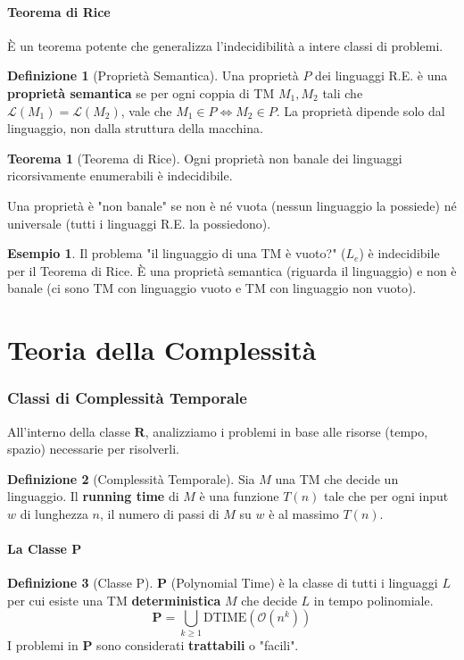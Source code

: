 \documentclass[a4paper]{article}
\theoremstyle{definition} %
\newtheorem{theorem}{Teorema}
\newtheorem{definition}{Definizione}
\newtheorem{example}{Esempio}
\newcommand{\lang}[1]{\mathcal{L}(#1)}
\newcommand{\bigO}[1]{\mathcal{O}(#1)}
\begin{document}
\subsection{Teorema di Rice}
È un teorema potente che generalizza l'indecidibilità a intere classi di problemi.
\begin{definition}[Proprietà Semantica]
Una proprietà $P$ dei linguaggi R.E. è una \textbf{proprietà semantica} se per ogni coppia di TM $M_1, M_2$ tali che $\lang{M_1} = \lang{M_2}$, vale che $M_1 \in P \iff M_2 \in P$. La proprietà dipende solo dal linguaggio, non dalla struttura della macchina.
\end{definition}
\begin{theorem}[Teorema di Rice]
Ogni proprietà non banale dei linguaggi ricorsivamente enumerabili è indecidibile.
\end{theorem}
Una proprietà è "non banale" se non è né vuota (nessun linguaggio la possiede) né universale (tutti i linguaggi R.E. la possiedono).
\begin{example}
Il problema "il linguaggio di una TM è vuoto?" ($L_e$) è indecidibile per il Teorema di Rice. È una proprietà semantica (riguarda il linguaggio) e non è banale (ci sono TM con linguaggio vuoto e TM con linguaggio non vuoto).
\end{example}

\part{Teoria della Complessità}

\section{Classi di Complessità Temporale}
All'interno della classe $\mathbf{R}$, analizziamo i problemi in base alle risorse (tempo, spazio) necessarie per risolverli.
\begin{definition}[Complessità Temporale]
Sia $M$ una TM che decide un linguaggio. Il \textbf{running time} di $M$ è una funzione $T(n)$ tale che per ogni input $w$ di lunghezza $n$, il numero di passi di $M$ su $w$ è al massimo $T(n)$.
\end{definition}

\subsection{La Classe P}
\begin{definition}[Classe P]
$\mathbf{P}$ (Polynomial Time) è la classe di tutti i linguaggi $L$ per cui esiste una TM \textbf{deterministica} $M$ che decide $L$ in tempo polinomiale.
$$ \mathbf{P} = \bigcup_{k \ge 1} \text{DTIME}(\bigO{n^k}) $$
I problemi in $\mathbf{P}$ sono considerati \textbf{trattabili} o "facili".
\end{definition}
\end{document}
